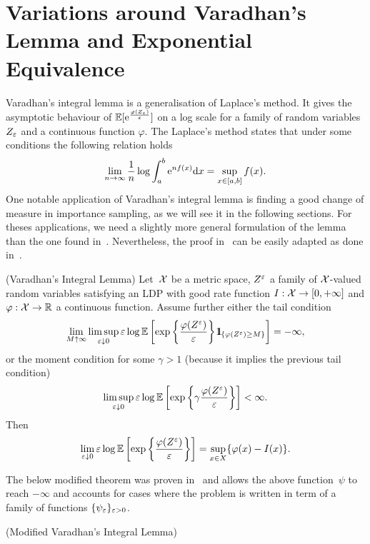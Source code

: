 
\section{Variations around Varadhan's Lemma and Exponential Equivalence}\label{sec:varadhan}
\small{
Varadhan's integral lemma is a generalisation of Laplace's method. It gives the asymptotic behaviour of $\mathbb{E}[\mathrm{e}^{\frac{\varphi(Z_{\varepsilon})}{\varepsilon}}]$ on a log scale for a family of random variables $Z_{\varepsilon}$ and a continuous function $\varphi$. The Laplace's method states that under some conditions the following relation holds
$$\lim_{n\rightarrow\infty}\frac{1}{n}\log \int_a^b \mathrm{e}^{n f(x)} \mathrm{d} x = \sup\limits_{x\in[a,b]}f(x).$$
One notable application of Varadhan's integral lemma is finding a good change of measure in importance sampling, as we will see it in the following sections. For theses applications, we need a slightly more general formulation of the lemma than the one found in~\cite[Theorem~4.3.1]{Dembo2010LargeApplications}. Nevertheless, the proof in~\cite[Theorem~4.3.1]{Dembo2010LargeApplications} can be easily adapted as done in~\cite[Lemma~4.4.]{Robertson2010SampleModels}.
\begin{theorem} (Varadhan's Integral Lemma)\label{thm:varadhan}
Let~$\mathcal{X}$ be a metric space, $Z^{\varepsilon}$ a family of $\mathcal{X}$-valued random variables satisfying an LDP with good rate function $I:\mathcal{X}\rightarrow [0,+\infty]$ and  $\varphi : \mathcal{X} \rightarrow \mathbb{R}$ a continuous function. 
Assume further either the tail condition
$$
\lim\limits_{M\uparrow \infty} \limsup_{\eps \downarrow 0}
\eps\log \EE\left[\exp\left\{\frac{\varphi(Z^{\eps})}{\eps}\right\}\ind_{ \{ \varphi(Z^{\eps}) \geq M\}}\right]  = - \infty,
$$
or the moment condition for some $\gamma > 1$ (because it implies the previous tail condition)
$$
\limsup\limits_{\varepsilon \downarrow 0}
\varepsilon\log \mathbb{E}\left[\exp\left\{\gamma \frac{\varphi(Z^{\varepsilon})}{\varepsilon}\right\}\right]
< \infty .
$$
Then
$$
\lim_{\varepsilon \downarrow 0}
\varepsilon\log \mathbb{E}\left[\exp\left\{\frac{\varphi(Z^{\varepsilon})}{\varepsilon}\right\}\right]
= \sup\limits_{x \in X} \{\varphi(x) - I(x) \}.
$$
\end{theorem}
The below modified theorem was proven in~\cite{Robertson2010SampleModels} and allows the above function~$\psi$ to reach $-\infty$ and accounts for cases where the problem is written in term of a family of functions $\{\psi_{\varepsilon}\}_{\varepsilon>0}$.
\begin{theorem}(Modified Varadhan's Integral Lemma)\label{thm:varadhan_modified}

\end{theorem}}
